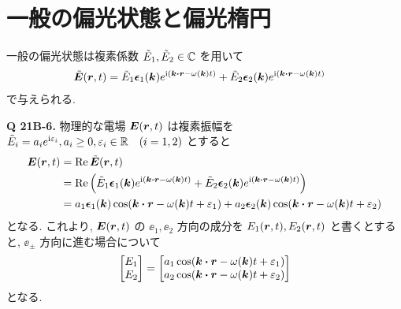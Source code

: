 \documentclass[uplatex,a4paper,dvipdfmx]{jsarticle}
\theoremstyle{definition}
\begin{document}
\section{一般の偏光状態と偏光楕円}
一般の偏光状態は複素係数 $\tilde{E}_1, \tilde{E}_2\in\mathbb{C}$ を用いて
\begin{align}
  \tilde{\EE}(\rr, t) & = \tilde{E}_1\ee_1(\kk)e^{\ii(\kk\vdot\rr - \omega(\kk)t)} + \tilde{E}_2\ee_2(\kk)e^{\ii(\kk\vdot\rr - \omega(\kk)t)} \label{tilde E def}
\end{align}
で与えられる.

\textbf{Q 21B-6.} 物理的な電場 $\vb*{E}(\vb*{r}, t)$ は複素振幅を $\tilde{E}_i = a_ie^{\mathrm{i}\varepsilon_i}, a_i \geq 0, \varepsilon_i\in\mathbb{R} \quad (i = 1, 2)$ とすると
\begin{align}
  \EE(\rr, t) & = \Re\tilde{\EE}(\rr, t)                                                                                                                      \\
              & = \Re\qty(\tilde{E}_1\ee_1(\kk)e^{\ii(\kk\vdot\rr - \omega(\kk)t)} + \tilde{E}_2\ee_2(\kk)e^{\ii(\kk\vdot\rr - \omega(\kk)t)})                \\
              & = a_1\ee_1(\kk)\cos(\kk\vdot\rr - \omega(\kk)t + \varepsilon_1) + a_2\ee_2(\kk)\cos(\kk\vdot\rr - \omega(\kk)t + \varepsilon_2) \label{E def}
\end{align}
となる. これより, $\vb*{E}(\vb*{r}, t)$ の $\ee_1, \ee_2$ 方向の成分を $E_1(\vb*{r}, t), E_2(\vb*{r}, t)$ と書くとすると, $\ee_\pm$ 方向に進む場合について
\begin{align}
  \mqty[E_1 \\ E_2] = \mqty[a_1\cos(\kk\vdot\rr - \omega(\kk)t + \varepsilon_1) \\ a_2\cos(\kk\vdot\rr - \omega(\kk)t + \varepsilon_2)] \label{genral E vector}
\end{align}
となる.
\end{document}
